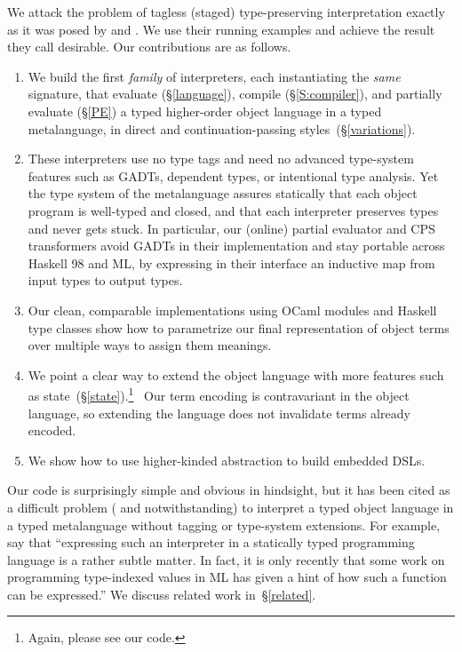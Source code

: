 We attack the problem of tagless (staged) type-preserving
interpretation exactly as it was posed
by \citet{WalidICFP02} and \citet{xi-guarded}.
We use their running examples and achieve the
result they call desirable.  Our contributions are as follows.
\begin{enumerate}
\item We build the first \emph{family} of interpreters, each instantiating the
   \emph{same} signature, that evaluate (\S\ref{language}),
   compile (\S\ref{S:compiler}), and 
   partially evaluate (\S\ref{PE}) a typed higher-order object language
   in a typed metalanguage, in direct and continuation\hyp passing
   styles\ifshort\else\ (\S\ref{variations})\fi.
\item These interpreters use no type tags
    and need no advanced type-system features such as GADTs, dependent types,
    or intentional type analysis.
    Yet the type system of the metalanguage
    assures statically that each object program is well-typed and closed,
    and that each interpreter preserves types and never gets stuck.
    In particular, our (online) partial evaluator and CPS transformers
    avoid GADTs in their implementation and stay portable across
    Haskell 98 and ML, by expressing in their interface an inductive
    map from input types to output types.
\item Our clean, comparable implementations using OCaml modules and Haskell
    type classes show how to parametrize our final representation of object
    terms over multiple ways to assign them meanings.
\item We point a clear way to extend the object language with more features
    such as state\ifshort\else~(\S\ref{state})\fi.\ifshort\footnote{Again, please see our code.}\fi
    \ Our term encoding is contravariant in the object language, so
    extending the language does not invalidate terms already encoded.
\item We show how to use higher-kinded abstraction to build
    embedded DSLs.
\end{enumerate}
Our code is surprisingly simple and obvious in hindsight, but
it has been cited as a difficult problem (\cite{sumii-hybrid}
and \cite{Thiemann-combinators}
notwithstanding) to interpret a typed object language in a typed metalanguage
without tagging or type\hyp system extensions.  For example, \citet{taha-tag}
say that ``expressing such an interpreter in a statically typed
programming language is a rather subtle matter. In fact, it is only
recently that some work on programming type-indexed values in ML
\citep{yang-encoding} has given a hint of how such a function can be
expressed.''  We discuss related work in~\S\ref{related}.

